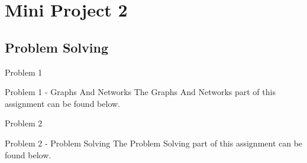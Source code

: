 \clearpage

\chapter{Mini Project 2}
\section{Problem Solving}

\begin{problem}{Problem 1}
    \begin{statement}{Problem 1 - Graphs And Networks}
        The Graphs And Networks part of this assignment can be found below.
    \end{statement}

    
\end{problem}

\begin{problem}{Problem 2}
    \begin{statement}{Problem 2 - Problem Solving}
        The Problem Solving part of this assignment can be found below.
    \end{statement}

    
\end{problem}
